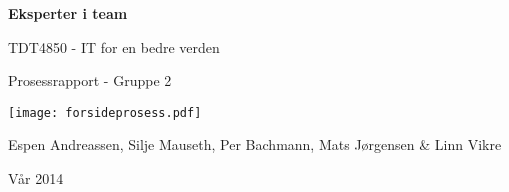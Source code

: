 \begin{titlepage}
\begin{center}
{\Huge {\bf Eksperter i team}}
\par
\vspace{0.1in}
{\LARGE TDT4850 - IT for en bedre verden}
\par
{\LARGE Prosessrapport - Gruppe 2}
\par
\vspace{0.5in}
\texttt{[image: forsideprosess.pdf]}

\par

\vfill{}
\vspace{0.5in}
Espen Andreassen, Silje Mauseth, Per Bachmann, Mats Jørgensen \& Linn Vikre
\par
Vår 2014
\end{center}
\end{titlepage}
